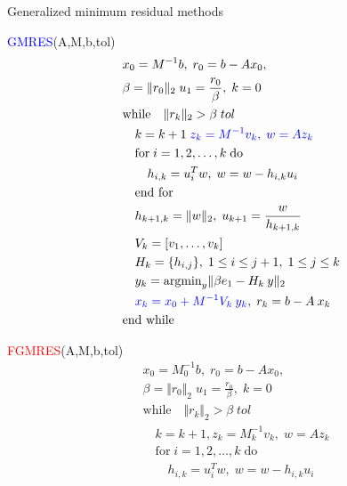 \documentclass[handout]{beamer}
{
\usepackage{fullpage}
\usepackage{hyperref}
\usepackage{amssymb} 
}
\newcommand{\blue}[1]{\textcolor{blue}{#1}}
\begin{document}
\begin{frame}{Generalized minimum residual methods}
\centering
\footnotesize{
\begin{minipage}{0.48\linewidth}
\begin{block}{\footnotesize {\textcolor{blue}{GMRES}(A,M,b,tol)}}
\vspace{-0.5cm}
\begin{align*}
   &x_0 = M^{-1}b, \; r_0 = b - Ax_0, \\ 
   &\beta = \Vert r_0 \Vert_2 \; u_1 = \frac{r_0}{\beta}, \; k = 0 \\
   &\text{while} \quad \Vert r_k \Vert_2 > \beta \; tol  \\
   &\quad k = k + 1 \; \blue{z_k = M^{-1} v_k, \; w = Az_k} \\
   &\quad \text{for} \; i = 1,2,\ldots,k \; \text{do} \\
   &\quad \quad h_{i,k} = u_i^T w, \; w = w - h_{i,k} u_i \\
   &\quad \text{end for} \\
   &\quad h_{k+1,k} = \Vert w \Vert_2, \; u_{k+1} = \frac{w}{h_{k+1,k}} \\
   &\quad V_k = [v_1, \ldots, v_k] \\ 
   &\quad H_k = \{h_{i,j}\}, \; 1\le i \le j+1, \; 1 \le j \le k \\
   &\quad y_k = \text{argmin}_y \Vert \beta e_1 - H_k \:  y \Vert_2 \\
   &\quad \textcolor{blue}{x_k = x_0 + M^{-1} V_k \: y_k}, \; r_k = b-A \: x_k \\
   &\text{end while}
\end{align*}
\end{block}
\end{minipage}
\hfill
\begin{minipage}{0.48\linewidth}
\begin{block}{\footnotesize {\textcolor{red}{FGMRES}(A,M,b,tol)}}
\vspace{-0.5cm}
\begin{align*}
   &x_0 = M^{-1}_0b, \; r_0 = b - Ax_0, \\ 
   &\beta = \Vert r_0 \Vert_2 \; u_1 = \frac{r_0}{\beta}, \; k = 0 \\
   &\text{while} \quad \Vert r_k \Vert_2 > \beta \; tol  \\
   &\quad k = k + 1, z_k = M^{-1}_k v_k, \; w = Az_k \\
   &\quad \text{for} \; i = 1,2,\ldots,k \; \text{do} \\
   &\quad \quad h_{i,k} = u_i^T w, \; w = w - h_{i,k} u_i \\

\end{align*}
\end{block}
\end{minipage}}
\end{frame}
\end{document}
